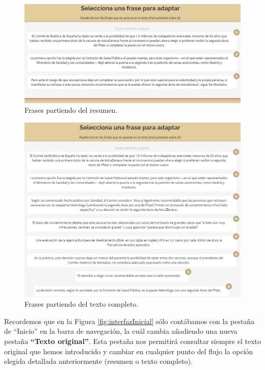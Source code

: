 \begin{itemize}
\begin{figure}[h!]
 	 	 	
 	 	 	\includegraphics[scale=0.7]{Imagenes/Figuras/Resumen}
 	 	 	
 	 	 	
 	 	 	\caption{Frases partiendo del resumen.}
 	 	 	\label{fig:interfazFraseTextoResumido}
 	 	 \end{figure}
 	 	 
 	 	 
 	 	 \begin{figure}[h!]
 	 	 	\centering
 	 	 	
 	 	 	
 	 	 	\includegraphics[scale=0.7]{Imagenes/Figuras/TextoCompleto}
 	 	 	
 	 	 	
 	 	 	\caption{Frases partiendo del texto completo.}
 	 	 	\label{fig:interfazIntroducirCompleto}
 	 	 \end{figure}	
 \end{itemize}

	Recordemos que en la Figura \ref{fig:interfazInicial} sólo contábamos con la pestaña de ``Inicio'' en la barra de navegación, la cuál cambia añadiendo una nueva pestaña \textbf{``Texto original''}. Esta pestaña nos permitirá consultar siempre el texto original que hemos introducido y cambiar en cualquier punto del flujo la opción elegida detallada anteriormente (resumen o texto completo). 


